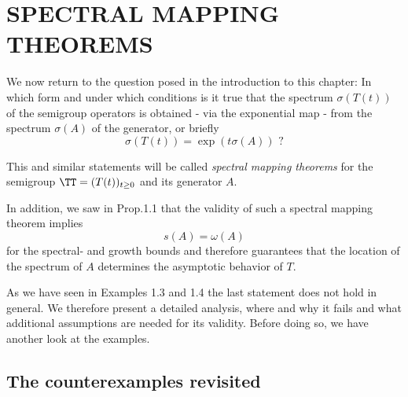 \section{SPECTRAL MAPPING THEOREMS}\label{sec:a3-6}

We now return to the question posed in the introduction to this chapter: In which form and under which conditions is it true that the spectrum $\sigma(T(t))$ of the semigroup operators is obtained - via the exponential map - from the spectrum $\sigma(A)$ of the generator, or briefly
\[
\sigma(T(t)) = \exp(t\sigma(A)) \text{ ?}
\]

This and similar statements will be called \emph{spectral mapping theorems} for the semigroup $\TT = (T(t))_{t \geq 0}$ and its generator $A$.


\newpage
In addition, we saw in Prop.1.1 that the validity of such a spectral mapping theorem implies
\[
s(A) = \omega(A)
\]
for the spectral- and growth bounds and therefore guarantees that the location of the spectrum of $A$ determines the asymptotic behavior of $T$.

As we have seen in Examples 1.3 and 1.4 the last statement does not hold in general.
We therefore present a detailed analysis, where and why it fails and what additional assumptions are needed for its validity.
Before doing so, we have another look at the examples.

\subsection{The counterexamples revisited}\label{subsec:a3-6.1}

